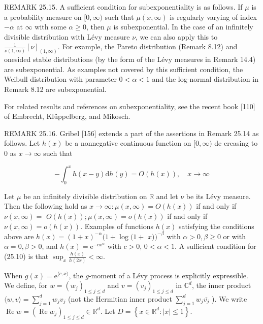 \documentclass[a4paper,12pt]{article}
\begin{document}
REMARK 25.15. A sufficient condition for subexponentiality is as follows. If $\mu$ is a probability measure on $[0, \infty)$ such that $\mu(x, \infty)$ is regularly varying of index $-\alpha$ at $\infty$ with some $\alpha \geq 0$, then $\mu$ is subexponential. In the case of an infinitely divisible distribution with Lévy measure $\nu$, we can also apply this to $\frac{1}{\nu(1, \infty)}[\nu]_{(1, \infty)}$. For example, the Pareto distribution (Remark 8.12) and onesided stable distributions (by the form of the Lévy measures in Remark 14.4) are subexponential. As examples not covered by this sufficient condition, the Weibull distribution with parameter $0<\alpha<1$ and the log-normal distribution in Remark 8.12 are subexponential.

For related results and references on subexponentiality, see the recent book [110] of Embrecht, Klüppelberg, and Mikosch.

REMARK 25.16. Gribel [156] extends a part of the assertions in Remark 25.14 as follows. Let $h(x)$ be a nonnegative continuous function on $[0, \infty)$ de creasing to 0 as $x \rightarrow \infty$ such that


\begin{equation*}
    -\int_{0}^{x} h(x-y) \mathrm{d} h(y)=O(h(x)), \quad x \rightarrow \infty \tag{25.10}
\end{equation*}


Let $\mu$ be an infinitely divisible distribution on $\mathbb{R}$ and let $\nu$ be its Lévy measure. Then the following hold as $x \rightarrow \infty: \mu(x, \infty)=O(h(x))$ if and only if $\nu(x, \infty)=$ $O(h(x)) ; \mu(x, \infty)=o(h(x))$ if and only if $\nu(x, \infty)=o(h(x))$. Examples of functions $h(x)$ satisfying the conditions above are $h(x)=(1+x)^{-\alpha}(1+\log (1+$ $x))^{-\beta}$ with $\alpha>0, \beta \geq 0$ or with $\alpha=0, \beta>0$, and $h(x)=\mathrm{e}^{-c x^{\alpha}}$ with $c>0$, $0<\alpha<1$. A sufficient condition for (25.10) is that $\sup _{x} \frac{h(x)}{h(2 x)}<\infty$.

When $g(x)=\mathrm{e}^{\langle c, x\rangle}$, the $g$-moment of a Lévy process is explicitly expressible. We define, for $w=\left(w_{j}\right)_{1 \leq j \leq d}$ and $v=\left(v_{j}\right)_{1 \leq j \leq d}$ in $\mathbb{C}^{d}$, the inner product $\langle w, v\rangle=\sum_{j=1}^{d} w_{j} v_{j}$ (not the Hermitian inner product $\sum_{j=1}^{d} w_{j} \overline{v_{j}}$ ). We write $\operatorname{Re} w=\left(\operatorname{Re} w_{j}\right)_{1 \leq j \leq d} \in \mathbb{R}^{d}$. Let $D=\left\{x \in \mathbb{R}^{d}:|x| \leq 1\right\}$.
\end{document}
